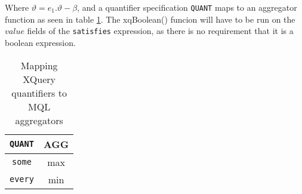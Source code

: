 Where $\vartheta=e_1.\vartheta-\beta$, and a quantifier specification \texttt{QUANT} maps to an aggregator
function as seen in table \ref{tab:disc:quant}. The \textsf{xqBoolean()} funcion will have to be run on the
$value$ fields of the \texttt{satisfies} expression, as there is no requirement that it is a boolean expression.

\begin{table}[h]
\centering
\begin{tabular}{c|c} 
\texttt{QUANT} & \textsf{AGG} \\ \hline
\texttt{some} & \textsf{max} \\
\texttt{every} & \textsf{min}
\end{tabular}
\caption{Mapping XQuery quantifiers to MQL aggregators \label{tab:disc:quant}}
\end{table}

